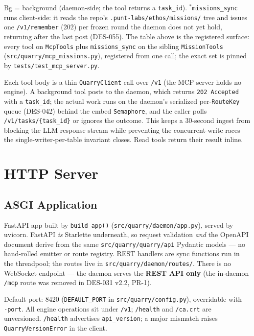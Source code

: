 \documentclass[a4paper,10pt]{article}
\newcommand{\modpath}[1]{\texttt{src/quarry/#1}}
\newcommand{\tool}[1]{\texttt{#1}}
\newcommand{\field}[1]{\texttt{#1}}
\begin{document}
Bg = background (daemon-side; the tool returns a \field{task\_id}).
$^{*}$\tool{missions\_sync} runs client-side: it reads the repo's
\texttt{.punt-labs/ethos/missions/} tree and issues one
\texttt{/v1/remember} (202) per frozen round the daemon does not yet hold,
returning after the last post (DES-055).  The table above is the
registered surface: every tool on \texttt{McpTools} plus
\texttt{missions\_sync} on the sibling \texttt{MissionTools}
(\modpath{mcp\_missions.py}), registered from one call; the exact set is
pinned by \texttt{tests/test\_mcp\_server.py}.

Each tool body is a thin \texttt{QuarryClient} call over \texttt{/v1}
(the MCP server holds no engine).  A background tool posts to the daemon,
which returns \texttt{202~Accepted} with a \field{task\_id}; the actual
work runs on the daemon's serialized per-\texttt{RouteKey} queue (DES-042)
behind the embed \texttt{Semaphore}, and the caller polls
\texttt{/v1/tasks/\{task\_id\}} or ignores the outcome.  This keeps a
30-second ingest from blocking the LLM response stream while preventing
the concurrent-write races the single-writer-per-table invariant closes.
Read tools return their result inline.

\section{HTTP Server}

\subsection{ASGI Application}

FastAPI app built by \texttt{build\_app()} (\modpath{daemon/app.py}),
served by uvicorn.  FastAPI \emph{is} Starlette underneath, so request
validation \emph{and} the OpenAPI document derive from the same
\modpath{quarry/api} Pydantic models --- no hand-rolled emitter or route
registry.  REST handlers are sync functions run in the threadpool; the
routes live in \modpath{daemon/routes/}.  There is no WebSocket endpoint
--- the daemon serves the \textbf{REST API only} (the in-daemon
\texttt{/mcp} route was removed in DES-031 v2.2, PR-1).

Default port: 8420 (\texttt{DEFAULT\_PORT} in \modpath{config.py}),
overridable with \texttt{-{}-port}.  All engine operations sit under
\texttt{/v1}; \texttt{/health} and \texttt{/ca.crt} are unversioned.
\texttt{/health} advertises \field{api\_version}; a major mismatch
raises \texttt{QuarryVersionError} in the client.
\end{document}
